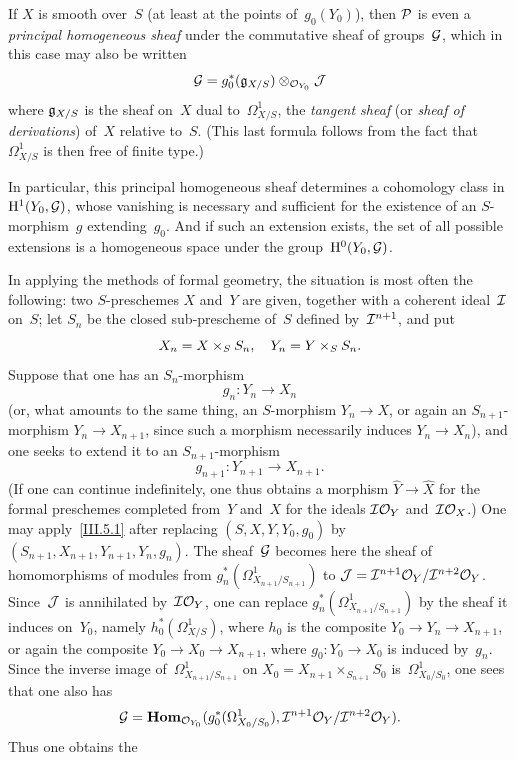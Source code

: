 \begin{corollary}
\label{III.5.2}
If $X$ is smooth over~$S$ (at least at the points of~$g_0(Y_0)$), then
$\cal{P}$ is even a \emph{principal homogeneous sheaf} under the
commutative sheaf of groups~$\cal{G}$, which in this case may also be
written
\begin{equation*}
\cal{G}=g_0^*(\goth{g}_{X/S})\otimes_{\cal{O}_{Y_0}}\cal{J}
\end{equation*}
where $\goth{g}_{X/S}$ is the sheaf on~$X$ dual to~$\Omega^1_{X/S}$,
\ie the \emph{tangent sheaf} (or \emph{sheaf of derivations}) of~$X$
relative to~$S$. (This last formula follows from the fact that
$\Omega^1_{X/S}$ is then free of finite type.)
\end{corollary}

In particular, this principal homogeneous sheaf determines a cohomology
class in~$\H^1(Y_0,\cal{G})$, whose vanishing is necessary and sufficient
for the existence of an $S$-morphism~$g$ extending~$g_0$. And if such an
extension exists, the set of all possible extensions is a homogeneous
space under the group~$\H^0(Y_0,\cal{G})$.

In applying the methods of formal geometry, the situation is most often
the following: two $S$-preschemes $X$ and~$Y$ are given, together with
a coherent ideal~$\cal{I}$ on~$S$; let $S_n$ be the closed sub-prescheme
of~$S$ defined by~$\cal{I}^{n+1}$, and put
\begin{equation*}
X_n=X\times_S S_n \quoi,\quad Y_n=Y\times_S S_n.
\end{equation*}
Suppose that one has an $S_n$-morphism
\begin{equation*}
g_n\colon Y_n\to X_n
\end{equation*}
(or, what amounts to the same thing, an $S$-morphism $Y_n\to X$, or
again an $S_{n+1}$-morphism $Y_n\to X_{n+1}$, since such a morphism
necessarily induces $Y_n\to X_n$), and one seeks to extend it to an
$S_{n+1}$-morphism
\begin{equation*}
g_{n+1}\colon Y_{n+1}\to X_{n+1}.
\end{equation*}
(If one can continue indefinitely, one thus obtains a morphism
$\widehat{Y}\to\widehat{X}$ for the formal preschemes completed from~$Y$
and~$X$ for the ideals $\cal{I}\cal{O}_Y$ and~$\cal{I}\cal{O}_X$.) One may
apply~\ref{III.5.1} after replacing $(S,X,Y,Y_0,g_0)$ by
$(S_{n+1},X_{n+1},Y_{n+1},Y_n,g_n)$. The sheaf~$\cal{G}$ becomes here
the sheaf of homomorphisms of modules from
$g_n^*(\Omega^1_{X_{n+1}/S_{n+1}})$ to
$\cal{J}=\cal{I}^{n+1}\cal{O}_Y/\cal{I}^{n+2}\cal{O}_Y$. Since~$\cal{J}$ is
annihilated by~$\cal{I}\cal{O}_Y$, one can replace
$g_n^*(\Omega^1_{X_{n+1}/S_{n+1}})$ by the sheaf it induces on~$Y_0$,
namely $h_0^*(\Omega^1_{X/S})$, where $h_0$ is the composite
$Y_0\to Y_n\to X_{n+1}$, or again the composite
$Y_0\to X_0\to X_{n+1}$, where $g_0\colon Y_0\to X_0$ is induced by~$g_n$.
Since the inverse image of~$\Omega^1_{X_{n+1}/S_{n+1}}$ on
$X_0=X_{n+1}\times_{S_{n+1}}S_0$ is~$\Omega^1_{X_0/S_0}$, one sees
that one also has
\begin{equation*}
\cal{G}=\SheafHom_{\cal{O}_{Y_0}} (g_0^*(\Omega^1_{X_0/S_0}),
\cal{I}^{n+1}\cal{O}_Y/\cal{I}^{n+2}\cal{O}_Y).
\end{equation*}
Thus one obtains the

